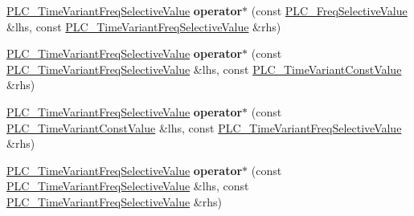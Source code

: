 \begin{DoxyCompactItemize}
\item 
\hypertarget{classns3_1_1PLC__TimeVariantFreqSelectiveValue_a88fb44f4a92e23a2d32b9f75d2c56da7}{\hyperlink{classns3_1_1PLC__TimeVariantFreqSelectiveValue}{\-P\-L\-C\-\_\-\-Time\-Variant\-Freq\-Selective\-Value} {\bfseries operator$\ast$} (const \hyperlink{classns3_1_1PLC__FreqSelectiveValue}{\-P\-L\-C\-\_\-\-Freq\-Selective\-Value} \&lhs, const \hyperlink{classns3_1_1PLC__TimeVariantFreqSelectiveValue}{\-P\-L\-C\-\_\-\-Time\-Variant\-Freq\-Selective\-Value} \&rhs)}\label{classns3_1_1PLC__TimeVariantFreqSelectiveValue_a88fb44f4a92e23a2d32b9f75d2c56da7}

\item 
\hypertarget{classns3_1_1PLC__TimeVariantFreqSelectiveValue_aac5062dacea06c2785976cd92e890ae5}{\hyperlink{classns3_1_1PLC__TimeVariantFreqSelectiveValue}{\-P\-L\-C\-\_\-\-Time\-Variant\-Freq\-Selective\-Value} {\bfseries operator$\ast$} (const \hyperlink{classns3_1_1PLC__TimeVariantFreqSelectiveValue}{\-P\-L\-C\-\_\-\-Time\-Variant\-Freq\-Selective\-Value} \&lhs, const \hyperlink{classns3_1_1PLC__TimeVariantConstValue}{\-P\-L\-C\-\_\-\-Time\-Variant\-Const\-Value} \&rhs)}\label{classns3_1_1PLC__TimeVariantFreqSelectiveValue_aac5062dacea06c2785976cd92e890ae5}

\item 
\hypertarget{classns3_1_1PLC__TimeVariantFreqSelectiveValue_ae214ac942460bcc41a73891586f15e85}{\hyperlink{classns3_1_1PLC__TimeVariantFreqSelectiveValue}{\-P\-L\-C\-\_\-\-Time\-Variant\-Freq\-Selective\-Value} {\bfseries operator$\ast$} (const \hyperlink{classns3_1_1PLC__TimeVariantConstValue}{\-P\-L\-C\-\_\-\-Time\-Variant\-Const\-Value} \&lhs, const \hyperlink{classns3_1_1PLC__TimeVariantFreqSelectiveValue}{\-P\-L\-C\-\_\-\-Time\-Variant\-Freq\-Selective\-Value} \&rhs)}\label{classns3_1_1PLC__TimeVariantFreqSelectiveValue_ae214ac942460bcc41a73891586f15e85}

\item 
\hypertarget{classns3_1_1PLC__TimeVariantFreqSelectiveValue_a1ad890c6de64e05b5aa118fe4a03be87}{\hyperlink{classns3_1_1PLC__TimeVariantFreqSelectiveValue}{\-P\-L\-C\-\_\-\-Time\-Variant\-Freq\-Selective\-Value} {\bfseries operator$\ast$} (const \hyperlink{classns3_1_1PLC__TimeVariantFreqSelectiveValue}{\-P\-L\-C\-\_\-\-Time\-Variant\-Freq\-Selective\-Value} \&lhs, const \hyperlink{classns3_1_1PLC__TimeVariantFreqSelectiveValue}{\-P\-L\-C\-\_\-\-Time\-Variant\-Freq\-Selective\-Value} \&rhs)}\label{classns3_1_1PLC__TimeVariantFreqSelectiveValue_a1ad890c6de64e05b5aa118fe4a03be87}


\end{DoxyCompactItemize}
